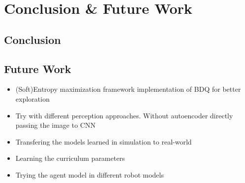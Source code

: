 
\chapter{Conclusion \& Future Work}\label{chapter:conclusion}

\section{Conclusion}


\section{Future Work}

\begin{itemize}
    \item (Soft)Entropy maximization framework implementation of BDQ for better exploration
    \item Try with different perception approaches. Without autoencoder directly passing the image to CNN
    \item Transfering the models learned in simulation to real-world
    \item Learning the curriculum parameters
    \item Trying the agent model in different robot models
\end{itemize}